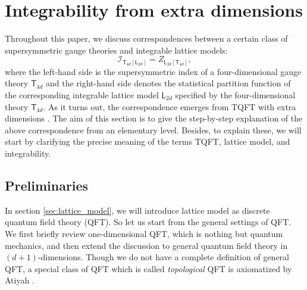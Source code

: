 \begin{comment}
\documentclass[11pt]{article}  %
\usepackage{Common/toshi}

\end{comment}


\section{Integrability from extra dimensions}
\label{sec:integrability}


Throughout this paper, we discuss correspondences between
a certain class of supersymmetric gauge theories and integrable lattice
models:
\begin{equation}
  \mathcal{I}_{\mathsf{T}_{4d}\left[\mathsf{L}_{2d}\right]}
    =  Z_{\mathsf{L}_{2d}\left[\mathsf{T}_{4d}\right]},
  \label{eq:correspondence}
\end{equation}
where the left-hand side is the supersymmetric index of a four-dimensional
gauge theory $\mathsf{T}_{4d}$ and the right-hand side denotes the
statistical partition function of the corresponding integrable lattice
model $\mathsf{L}_{2d}$ specified by the four-dimensional theory
$\mathsf{T}_{4d}$. As it turns out, the correspondence emerges from
TQFT with extra dimensions \cite{Yagi:2015lha}. The aim of this section is
to give the step-by-step explanation of the above correspondence from
an elementary level. Besides, to explain these, we will start by clarifying
the precise meaning of the terms TQFT, lattice model, and integrability.





\subsection{Preliminaries}

In section \ref{sec:lattice_model}, we will introduce lattice model as
discrete quantum field theory (QFT). So let us start from the general
settings of QFT. We first briefly review one-dimensional QFT, which
is nothing but quantum mechanics, and then extend the discussion to
general quantum field theory in $(d+1)$-dimensions. Though we do
not have a complete definition of general QFT, a special class of
QFT which is called \emph{topological} QFT is axiomatized by Atiyah
\cite{Atiyah:1989vu}.





